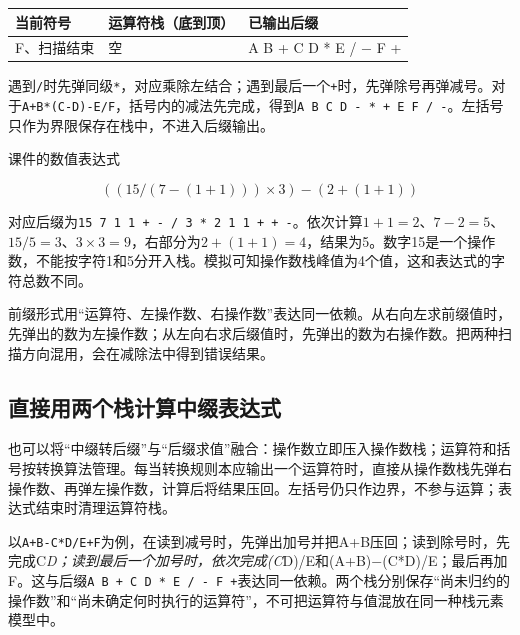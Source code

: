 \par\medskip\noindent\begin{minipage}{\linewidth}\fontsize{9.3}{12}\selectfont\begin{tabularx}{\linewidth}{@{}YYY@{}}
\toprule\noalign{}
当前符号 & 运算符栈（底到顶） & 已输出后缀 \\
\midrule\noalign{}


F、扫描结束 & 空 & A B + C D * E / \ensuremath{-} F + \\
\bottomrule\end{tabularx}
\end{minipage}\par\medskip

遇到\texttt{/\allowbreak{}}时先弹同级\texttt{*\allowbreak{}}，对应乘除左结合；遇到最后一个\texttt{+\allowbreak{}}时，先弹除号再弹减号。对于\texttt{A+\allowbreak{}B*\allowbreak{}(\allowbreak{}C-D)\allowbreak{}-E/\allowbreak{}F}，括号内的减法先完成，得到\texttt{A B C D - *\allowbreak{} +\allowbreak{} E F /\allowbreak{} -}。左括号只作为界限保存在栈中，不进入后缀输出。

课件的数值表达式

\[((15/(7-(1+1)))\times3)-(2+(1+1))\]

对应后缀为\texttt{15 7 1 1 +\allowbreak{} - /\allowbreak{} 3 *\allowbreak{} 2 1 1 +\allowbreak{} +\allowbreak{} -}。依次计算\(1+1=2\)、\(7-2=5\)、\(15/5=3\)、\(3\times3=9\)，右部分为\(2+(1+1)=4\)，结果为5。数字15是一个操作数，不能按字符1和5分开入栈。模拟可知操作数栈峰值为4个值，这和表达式的字符总数不同。

前缀形式用``运算符、左操作数、右操作数''表达同一依赖。从右向左求前缀值时，先弹出的数为左操作数；从左向右求后缀值时，先弹出的数为右操作数。把两种扫描方向混用，会在减除法中得到错误结果。

\subsection{直接用两个栈计算中缀表达式}\label{DS03-infix-eval}

也可以将``中缀转后缀''与``后缀求值''融合：操作数立即压入操作数栈；运算符和括号按转换算法管理。每当转换规则本应输出一个运算符时，直接从操作数栈先弹右操作数、再弹左操作数，计算后将结果压回。左括号仍只作边界，不参与运算；表达式结束时清理运算符栈。

以\texttt{A+\allowbreak{}B-C*\allowbreak{}D/\allowbreak{}E+\allowbreak{}F}为例，在读到减号时，先弹出加号并把A+B压回；读到除号时，先完成C\emph{D；读到最后一个加号时，依次完成(C}D)/E和(A+B)\ensuremath{-}(C*D)/E；最后再加F。这与后缀\texttt{A B +\allowbreak{} C D *\allowbreak{} E /\allowbreak{} - F +\allowbreak{}}表达同一依赖。两个栈分别保存``尚未归约的操作数''和``尚未确定何时执行的运算符''，不可把运算符与值混放在同一种栈元素模型中。

